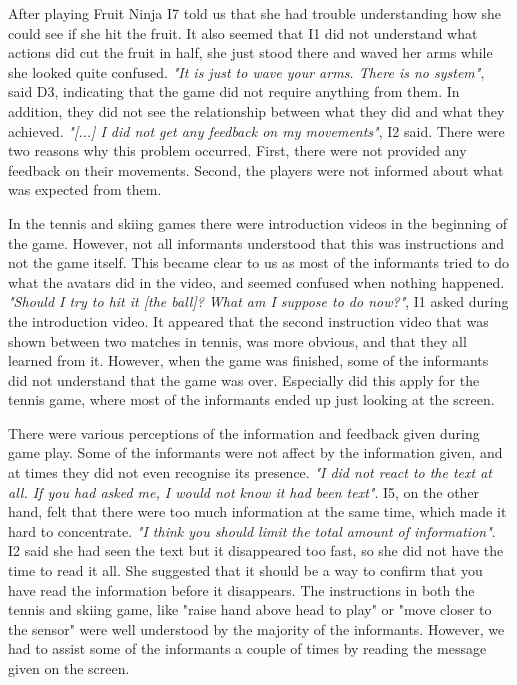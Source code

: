 After playing Fruit Ninja I7 told us that she had trouble understanding how she could see if she hit the fruit. It also seemed that I1 did not understand what actions did cut the fruit in half, she just stood there and waved her arms while she looked quite confused. \emph{"It is just to wave your arms. There is no system"}, said D3, indicating that the game did not require anything from them. In addition, they did not see the relationship between what they did and what they achieved. \emph{"[...] I did not get any feedback on my movements"}, I2 said. There were two reasons why this problem occurred. First, there were not provided any feedback on their movements. Second, the players were not informed about what was expected from them.  

In the tennis and skiing games there were introduction videos in the beginning of the game. However, not all informants understood that this was instructions and not the game itself. This became clear to us as most of the informants tried to do what the avatars did in the video, and seemed confused when nothing happened. \emph{"Should I try to hit it [the ball]? What am I suppose to do now?"}, I1 asked during the introduction video. It appeared that the second instruction video that was shown between two matches in tennis, was more obvious, and that they all learned from it. However, when the game was finished, some of the informants did not understand that the game was over. Especially did this apply for the tennis game, where most of the informants ended up just looking at the screen. 

There were various perceptions of the information and feedback given during game play. Some of the informants were not affect by the information given, and at times they did not even recognise its presence. \emph{"I did not react to the text at all. If you had asked me, I would not know it had been text"}. I5, on the other hand, felt that there were too much information at the same time, which made it hard to concentrate. \emph{"I think you should limit the total amount of information"}.  I2 said she had seen the text but it disappeared too fast, so she did not have the time to read it all. She suggested that it should be a way to confirm that you have read the information before it disappears. The instructions in both the tennis and skiing game, like "raise hand above head to play" or "move closer to the sensor" were well understood by the majority of the informants. However, we had to assist some of the informants a couple of times by reading the message given on the screen.  

